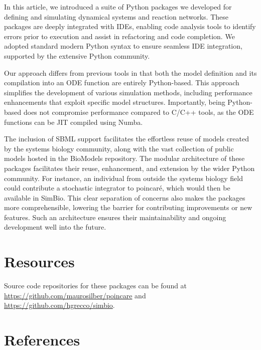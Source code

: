 \documentclass[
  letterpaper,
  DIV=11,
  numbers=noendperiod]{scrartcl}
\begin{document}
In this article, we introduced a suite of Python packages we developed
for defining and simulating dynamical systems and reaction networks.
These packages are deeply integrated with
\acp{IDE}, enabling code analysis tools to identify errors
prior to execution and assist in refactoring and code completion. We
adopted standard modern Python syntax to ensure seamless IDE
integration, supported by the extensive Python community.

Our approach differs from previous tools in that both the model
definition and its compilation into an
\ac{ODE} function are entirely Python-based. This approach simplifies the
development of various simulation methods, including performance
enhancements that exploit specific model structures. Importantly, being
Python-based does not compromise performance compared to C/C++ tools, as
the \ac{ODE} functions can be \ac{JIT} compiled using Numba.

The inclusion of \ac{SBML} support facilitates the effortless reuse of models
created by the systems biology community, along with the vast collection
of public models hosted in the BioModels repository. The modular
architecture of these packages facilitates their reuse, enhancement, and
extension by the wider Python community. For instance, an individual
from outside the systems biology field could contribute a stochastic
integrator to poincaré, which would then be available in SimBio. This
clear separation of concerns also makes the packages more
comprehensible, lowering the barrier for contributing improvements or
new features. Such an architecture ensures their maintainability and
ongoing development well into the future.

\hypertarget{resources}{%
\section{Resources}\label{resources}}

Source code repositories for these packages can be found at
\url{https://github.com/maurosilber/poincare} and
\url{https://github.com/hgrecco/simbio}.

\hypertarget{references}{%
\section{References}\label{references}}
\end{document}
